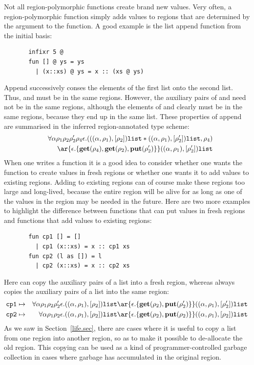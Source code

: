 \documentclass[12pt]{book}
\begin{document}
Not all region-polymorphic functions create brand new values. Very often, a
region-polymorphic function simply adds values to regions that are determined
by the argument to the function. A good example is the list append function
from the initial basis:
\begin{verbatim}
       infixr 5 @
       fun [] @ ys = ys
         | (x::xs) @ ys = x :: (xs @ ys)
\end{verbatim}
Append successively conses the elements of the first list onto the second list.
Thus,  and  must be in the same regions. However, the auxiliary pairs of
  and  need not be in the same regions, although
the elements of  and  clearly must be in the same regions,
because they end up in the same list. These properties of append are summarised
in the inferred region-annotated type scheme:
\begin{eqnarray*}
&&\forall\alpha\rho_1\rho_2\rho_2'\rho_4\epsilon.
   ( ((\alpha,\rho_1),[\rho_2])\boxml{list} \ast
      ((\alpha,\rho_1),[\rho_2'])\boxml{list}, \rho_4) \\ 
&&\ar{\epsilon.\{\Get(\rho_4),\Get(\rho_2),\Put(\rho_2')\}} ((\alpha,\rho_1),[\rho_2'])\boxml{list}
\end{eqnarray*}
When one writes a  function it is a good idea to consider
whether one wants the function  to create values in fresh regions or
whether one wants it to add values to existing regions. 
Adding to existing
regions can of course make these regions too large and long-lived,
because the entire region will be alive for as long as one of the values
in the region may be needed in the future. 
Here are two more examples
to highlight the difference between functions that can put values in
fresh regions and functions that add values to existing regions:
\begin{verbatim}
       fun cp1 [] = []   
         | cp1 (x::xs) = x :: cp1 xs
       fun cp2 (l as []) = l
         | cp2 (x::xs) = x :: cp2 xs
\end{verbatim}
Here  can copy the auxiliary pairs of a list into a fresh region, whereas  always
copies the auxiliary pairs of a list into the same region:
\begin{eqnarray*}
\boxml{cp1}&\mapsto&\forall\alpha\rho_1\rho_2\rho_2'\epsilon.
     ((\alpha,\rho_1),[\rho_2])\boxml{list} \ar{\epsilon.\{\Get(\rho_2),
           \Put(\rho_2')\}} ((\alpha,\rho_1),[\rho_2'])\boxml{list}\\
\boxml{cp2}&\mapsto&\forall\alpha\rho_1\rho_2\epsilon.
     ((\alpha,\rho_1),[\rho_2])\boxml{list} \ar{\epsilon.\{\Get(\rho_2),
           \Put(\rho_2)\}} ((\alpha,\rho_1),[\rho_2])\boxml{list}
\end{eqnarray*}
As we saw in Section~\ref{life.sec}, there are cases where it is useful to copy a list from one region into another region,
so as to make it possible to de-allocate the old region. This copying can be used
as a kind of programmer-controlled garbage collection in cases where garbage has accumulated
in the original region. 
\end{document}

